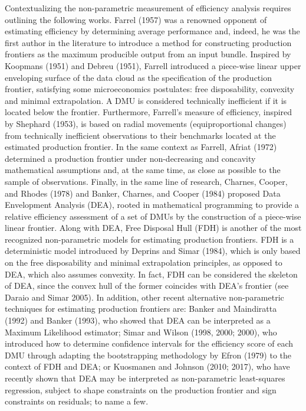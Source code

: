 Contextualizing the non-parametric measurement of efficiency analysis requires outlining the following works. Farrel (1957) was a renowned opponent of estimating efficiency by determining average performance and, indeed, he was the first author in the literature to introduce a method for constructing production frontiers as the maximum producible output from an input bundle. Inspired by Koopmans (1951) and Debreu (1951), Farrell introduced a piece-wise linear upper enveloping surface of the data cloud as the specification of the production frontier, satisfying some microeconomics postulates: free disposability, convexity and minimal extrapolation. A DMU is considered technically inefficient if it is located below the frontier. Furthermore, Farrell's measure of efficiency, inspired by Shephard (1953), is based on radial movements (equiproportional changes) from technically inefficient observations to their benchmarks located at the estimated production frontier. In the same context as Farrell, Afriat (1972) determined a production frontier under non-decreasing and concavity mathematical assumptions and, at the same time, as close as possible to the sample of observations. Finally, in the same line of research, Charnes, Cooper, and Rhodes (1978) and Banker, Charnes, and Cooper (1984) proposed Data Envelopment Analysis (DEA), rooted in mathematical programming to provide a relative efficiency assessment of a set of DMUs by the construction of a piece-wise linear frontier. Along with DEA, Free Disposal Hull (FDH) is another of the most recognized non-parametric models for estimating production frontiers. FDH is a deterministic model introduced by Deprins and Simar (1984), which is only based on the free disposability and minimal extrapolation principles, as opposed to DEA, which also assumes convexity. In fact, FDH can be considered the skeleton of DEA, since the convex hull of the former coincides with DEA's frontier (see Daraio and Simar 2005). In addition, other recent alternative non-parametric techniques for estimating production frontiers are: Banker and Maindiratta (1992) and Banker (1993), who showed that DEA can be interpreted as a Maximum Likelihood estimator; Simar and Wilson (1998, 2000; 2000), who introduced how to determine confidence intervals for the efficiency score of each DMU through adapting the bootstrapping methodology by Efron (1979) to the context of FDH and DEA; or Kuosmanen and Johnson (2010; 2017), who have recently shown that DEA may be interpreted as non-parametric least-squares regression, subject to shape constraints on the production frontier and sign constraints on residuals; to name a few.

